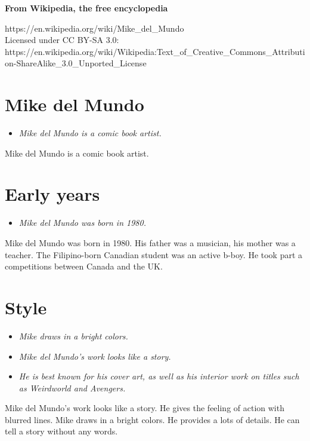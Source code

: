 \textbf{From Wikipedia, the free encyclopedia}

https://en.wikipedia.org/wiki/Mike\_del\_Mundo\\
Licensed under CC BY-SA 3.0:\\
https://en.wikipedia.org/wiki/Wikipedia:Text\_of\_Creative\_Commons\_Attribution-ShareAlike\_3.0\_Unported\_License

\section{Mike del Mundo}\label{mike-del-mundo}

\begin{itemize}
\item
  \emph{Mike del Mundo is a comic book artist.}
\end{itemize}

Mike del Mundo is a comic book artist.

\section{Early years}\label{early-years}

\begin{itemize}
\item
  \emph{Mike del Mundo was born in 1980.}
\end{itemize}

Mike del Mundo was born in 1980. His father was a musician, his mother
was a teacher. The Filipino-born Canadian student was an active b-boy.
He took part a competitions between Canada and the UK.

\section{Style}\label{style}

\begin{itemize}
\item
  \emph{Mike draws in a bright colors.}
\item
  \emph{Mike del Mundo's work looks like a story.}
\item
  \emph{He is best known for his cover art, as well as his interior work
  on titles such as Weirdworld and Avengers.}
\end{itemize}

Mike del Mundo's work looks like a story. He gives the feeling of action
with blurred lines. Mike draws in a bright colors. He provides a lots of
details. He can tell a story without any words.

